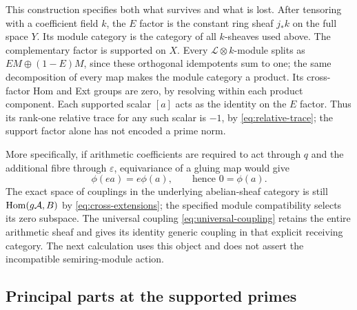 This construction specifies both what survives and what is lost.
After tensoring with a coefficient field $k$, the $E$ factor is the
constant ring sheaf $j_*k$ on the full space $Y$. Its module category
is the category of all $k$-sheaves used above. The complementary
factor is supported on $X$. Every $\mathcal L\otimes k$-module splits
as $EM\oplus(1-E)M$, since these orthogonal idempotents sum to one;
the same decomposition of every map makes the module category a
product. Its cross-factor Hom and Ext groups are zero, by resolving
within each product component. Each supported scalar $[a]$ acts as
the identity on the $E$ factor. Thus its rank-one relative trace for
any such scalar is $-1$, by \eqref{eq:relative-trace}; the support
factor alone has not encoded a prime norm.

More specifically, if arithmetic coefficients are required to act
through $q$ and the additional fibre through $\varepsilon$, equivariance
of a gluing map would give
\[
 \phi(ea)=e\phi(a),\qquad\text{hence }0=\phi(a).
 \tag{RP20}\label{eq:coupling-obstruction}
\]
The exact space of couplings in the underlying abelian-sheaf category
is still $\operatorname{Hom}(g\mathcal A,B)$ by \eqref{eq:cross-extensions}; the
specified module compatibility selects its zero subspace. The universal
coupling \eqref{eq:universal-coupling} retains the entire arithmetic
sheaf and gives its identity generic coupling in that explicit receiving
category. The next calculation uses this object and does not assert
the incompatible semiring-module action.

\subsection{Principal parts at the supported primes}
\label{sec:principal-parts}

